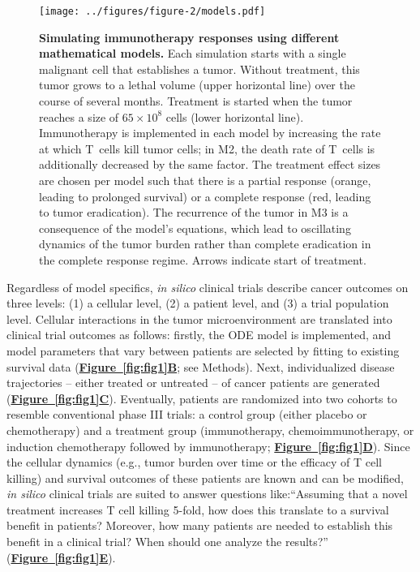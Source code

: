 \documentclass[a4paper,10pt]{article}
\newcommand{\myref}[2]{\hyperref[#1]{\bfseries Figure~\ref*{#1}#2}}
\newcommand{\newbit}{\color{red!70!black}}
\begin{document}
\begin{figure}
\centering \texttt{[image: ../figures/figure-2/models.pdf]}
\internallinenumbers\caption{\newbit
{\bfseries Simulating immunotherapy responses using different mathematical models.}
Each simulation starts with a single malignant cell that establishes a tumor. Without treatment,
this tumor grows to a lethal volume (upper horizontal line) over the course of several months.
Treatment is started when the tumor reaches a size of $65 \times 10^8$ cells (lower horizontal line).
Immunotherapy is implemented in each model by increasing the rate at which T~cells kill tumor cells; in M2, the death rate
of T~cells is additionally decreased by the same factor. The treatment effect sizes are chosen per model such that
there is a partial response (orange, leading to prolonged survival) or a complete response 
(red, leading to tumor eradication). The recurrence of the tumor in M3 is a consequence of the model's
equations, which lead to oscillating dynamics of the tumor burden rather than complete eradication in the 
complete response regime. Arrows indicate start of treatment.}
\label{fig:models}
\end{figure}

Regardless of model specifics, \emph{in silico}
clinical trials describe cancer outcomes on three levels: (1) a
cellular level, (2) a patient level, and (3) a trial population level. Cellular
interactions in the tumor microenvironment are translated into clinical trial
outcomes as follows: firstly, the ODE model is implemented, and model parameters
that vary between patients are selected by fitting to existing survival data (\myref{fig:fig1}B; see Methods).
Next, individualized disease trajectories -- either treated or untreated -- of
cancer patients are generated (\myref{fig:fig1}C). Eventually, patients are randomized
into two cohorts to resemble conventional phase III trials: a control group
(either placebo or chemotherapy) and a treatment group (immunotherapy,
chemoimmunotherapy, or induction chemotherapy followed by immunotherapy; \myref{fig:fig1}D). 
Since the cellular dynamics (e.g., tumor burden over time or the efficacy
of T cell killing) and survival outcomes of these patients are known and can be
modified, \emph{in silico} clinical trials are suited to answer questions
like:``Assuming that a novel treatment increases T cell killing 5-fold, how
does this translate to a survival benefit in patients? Moreover, how many
patients are needed to establish this benefit in a clinical trial? When should
one analyze the results?'' (\myref{fig:fig1}E).
\end{document}
